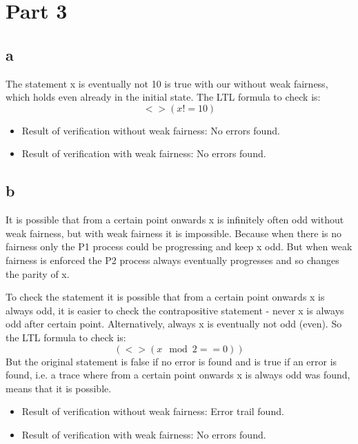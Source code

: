 \documentclass{article}
\begin{document}
\section*{Part 3}

\subsection*{a}
The statement x is eventually not 10 is true with our without weak fairness, which holds even already in the initial state. The LTL formula  to check is:
\begin{equation}
<>(x != 10)
\end{equation}

\begin{itemize}
\item Result of verification without weak fairness: No errors found.
\item Result of verification with weak fairness: No errors found.
\end{itemize}

\subsection*{b}

It is possible that from a certain point onwards x is infinitely often odd without weak fairness, but with weak fairness it is impossible. Because when there is no fairness only the P1 process could be progressing and keep x odd. But when weak fairness is enforced the P2 process always eventually progresses and so changes the parity of x.

To check the statement it is possible that from a certain point onwards x is always odd, it is easier to check the contrapositive statement - never x is always odd after certain point. Alternatively, always x is eventually not odd (even). So the LTL formula to check is:
\begin{equation}
[](<> (x \mod 2 == 0))
\end{equation}
But the original statement is false if no error is found and is true if an error is found, i.e. a trace where from a certain point onwards x is always odd was found, means that it is possible.

\begin{itemize}
\item Result of verification without weak fairness: Error trail found.
\item Result of verification with weak fairness: No errors found.
\end{itemize}
\end{document}
